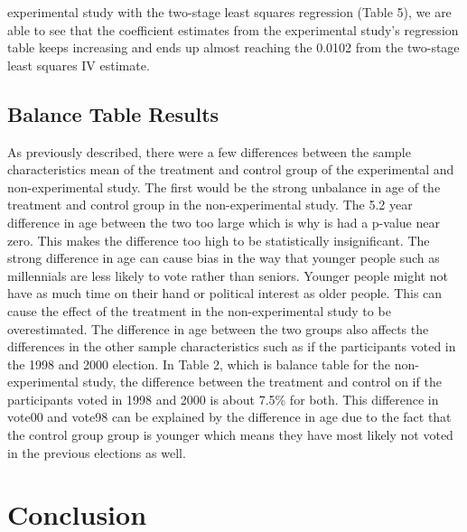 \documentclass[a4paper]{article}
\begin{document}
\begin{flushleft}
experimental study with the two-stage least squares regression (Table 5), we are able to see that the coefficient estimates from the experimental study's regression table keeps increasing and ends up almost reaching the 0.0102 from the two-stage least squares IV estimate. 
\end{flushleft}
\subsection{Balance Table Results}

As previously described, there were a few differences between the sample characteristics mean of the treatment and control group of the experimental and non-experimental study. The first would be the strong unbalance in age of the treatment and control group in the non-experimental study. The 5.2 year difference in age between the two too large which is why is had a p-value near zero. This makes the difference too high to be statistically insignificant. The strong difference in age can cause bias in the way that younger people such as millennials are less likely to vote rather than seniors. Younger people might not have as much time on their hand or political interest as older people. This can cause the effect of the treatment in the non-experimental study to be overestimated. The difference in age between the two groups also affects the differences in the other sample characteristics such as if the participants voted in the 1998 and 2000 election. In Table 2, which is balance table for the non-experimental study, the difference between the treatment and control on if the participants voted in 1998 and 2000 is about 7.5\% for both. This difference in vote00 and vote98 can be explained by the difference in age due to the fact that the control group group is younger which means they have most likely not voted in the previous elections as well. 

\section{Conclusion}
\end{document}
